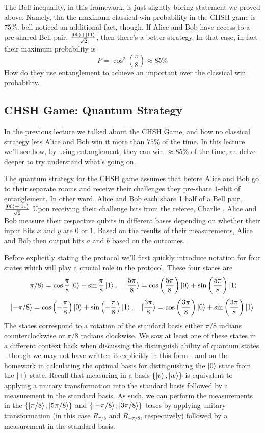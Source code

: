 The Bell inequality, in this framework, is just slightly boring statement we proved above. Namely, tha the maximum classical win probability in the CHSH game is $75\%$. bell noticed an additional fact, though. If Alice and Bob have access to a pre-shared Bell pair, $\frac{\ket{00}+\ket{11}}{\sqrt{2}}$, then there's a better strategy. In that case, in fact their maximum probability is 
\[
P=\cos^2\left(\frac{\pi}{8}\right)\approx 85\%
\]
How do they use entanglement to achieve an important over the classical win probability.

\subsection*{CHSH Game: Quantum Strategy}
In the previous lecture we talked about the CHSH Game, and how no classical strategy lets Alice and Bob win it more than $75\%$ of the time. In this lecture we'll see how, by using entanglement, they can win $\approx 85\%$ of the time, an delve deeper to try understand what's going on.

The quantum strategy for the CHSH game assumes that before Alice and Bob go to their separate rooms and receive their challenges they pre-share $1$-ebit of entanglement. In other word, Alice and Bob each share 1 half of a Bell pair, $\frac{\ket{00}+\ket{11}}{\sqrt{2}}$ Upon receiving their challenge bits from the referee, Charlie , Alice and Bob measure their respective qubits in different bases depending on whether their input bits $x$ and $y$ are $0$ or $1$. Based on the results of their measurements, Alice and Bob then output bits $a$ and $b$ based on the outcomes.

Before explicitly stating the protocol we'll first quickly introduce notation for four states which will play a crucial role in the protocol. These four states are
\[
\ket{\pi/8}=\cos\frac{\pi}{8}\ket{0} + \sin\frac{\pi}{8}\ket{1} ,\quad \ket{\frac{5\pi}{8}}=\cos
\left(\frac{5\pi}{8}\right) \ket{0}+\sin\left(\frac{5\pi}{8}\right)\ket{1}
\]
\[
\ket{-\pi/8}=\cos\left(-\frac{\pi}{8}\right)\ket{0}+\sin\left(-\frac{\pi}{8}\right)\ket{1},\quad \ket{\frac{3\pi}{8}}=\cos\left(\frac{3\pi}{8}\right) \ket{0}+\sin\left(\frac{3\pi}{8}\right) \ket{1}
\]
The states correspond to a rotation of the standard basis either $\pi/8$ radians counterclockwise or $\pi/8$ radians clockwise. We saw at least one of these states in a different context back when discussing the distinguish ability of quantum states - though we may not have written it explicitly in this form - and on the homework in calculating the optimal basis for distinguishing the $\ket{0}$ state from the $\ket{+}$ state. Recall that measuring in a basis $\{\ket{v},\ket{w}\}$ is equivalent to applying a unitary transformation into the standard basis followed by a measurement in the standard basis. As such, we can perform the measurements in the $\{\ket{\pi/8},\ket{5\pi/8}\}$ and $\{\ket{-\pi/8},\ket{3\pi/8}\}$ bases by applying unitary transformation (in this case $R_{\pi/8}$ and $R_{-\pi/8}$, respectively) followed by a measurement in the standard basis.

